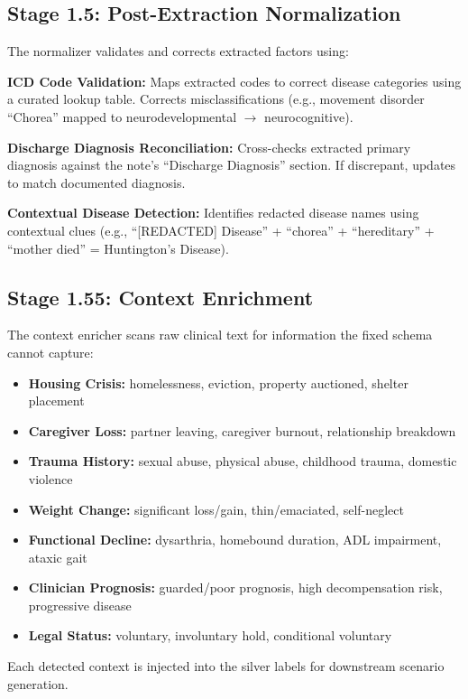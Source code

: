 \documentclass[conference]{IEEEtran}
\begin{document}
\subsection{Stage 1.5: Post-Extraction Normalization}

The normalizer validates and corrects extracted factors using:

\textbf{ICD Code Validation:} Maps extracted codes to correct disease categories using a curated lookup table. Corrects misclassifications (e.g., movement disorder ``Chorea'' mapped to neurodevelopmental $\rightarrow$ neurocognitive).

\textbf{Discharge Diagnosis Reconciliation:} Cross-checks extracted primary diagnosis against the note's ``Discharge Diagnosis'' section. If discrepant, updates to match documented diagnosis.

\textbf{Contextual Disease Detection:} Identifies redacted disease names using contextual clues (e.g., ``[REDACTED] Disease'' + ``chorea'' + ``hereditary'' + ``mother died'' = Huntington's Disease).

\subsection{Stage 1.55: Context Enrichment}

The context enricher scans raw clinical text for information the fixed schema cannot capture:

\begin{itemize}
\item \textbf{Housing Crisis:} homelessness, eviction, property auctioned, shelter placement
\item \textbf{Caregiver Loss:} partner leaving, caregiver burnout, relationship breakdown
\item \textbf{Trauma History:} sexual abuse, physical abuse, childhood trauma, domestic violence
\item \textbf{Weight Change:} significant loss/gain, thin/emaciated, self-neglect
\item \textbf{Functional Decline:} dysarthria, homebound duration, ADL impairment, ataxic gait
\item \textbf{Clinician Prognosis:} guarded/poor prognosis, high decompensation risk, progressive disease
\item \textbf{Legal Status:} voluntary, involuntary hold, conditional voluntary
\end{itemize}

Each detected context is injected into the silver labels for downstream scenario generation.
\end{document}
